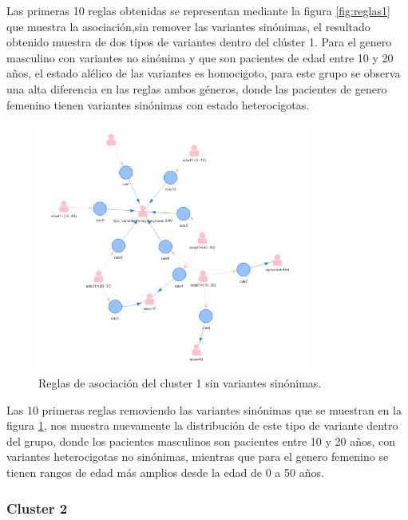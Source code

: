 Las primeras 10 reglas obtenidas se representan mediante la figura \ref{fig:reglas1} que muestra la asociación,sin remover las variantes sinónimas, el resultado obtenido muestra de dos tipos de variantes dentro del clúster 1. Para el genero masculino con variantes   no sinónima y que son pacientes de edad entre 10 y 20 años, el estado alélico de las variantes es homocigoto, para este grupo se observa una alta diferencia en las reglas ambos géneros, donde las pacientes de genero femenino tienen variantes sinónimas con estado heterocigotas.

\begin{figure}[H]
	\centering
	\includegraphics[width=0.8\textwidth]{Kap4/reglas1_2}
	\caption{Reglas de asociación del cluster 1 sin variantes sinónimas.} \label{fig:reglas2}
\end{figure}

Las 10 primeras reglas removiendo las variantes sinónimas que se muestran en la figura  \ref{fig:reglas2}, nos muestra nuevamente la distribución de este tipo de variante dentro del grupo, donde los pacientes masculinos son pacientes entre 10 y 20 años, con variantes heterocigotas no sinónimas, mientras que para el genero femenino se tienen rangos de edad más amplios desde la edad  de 0 a 50 años.

\subsubsection*{Cluster 2}

